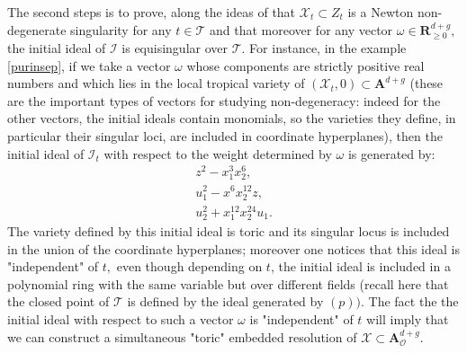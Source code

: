 \documentclass[11pt, a4paper]{amsart}
\numberwithin{equation}{section}
\theoremstyle{plain}
\theoremstyle{definition}
\theoremstyle{remark}
\newcommand{\cI}{\mathcal{I}}
\newcommand{\cO}{\mathcal{O}}
\newcommand{\cT}{\mathcal{T}}
\newcommand{\cX}{\mathcal{X}}
\newcommand{\0}{{\boldsymbol 0}}
\begin{document}
The second steps is to prove, along the ideas of \cite{Tevelev,Aroca1,AGM} that $\cX_t\subset Z_t$ is a Newton 
non-degenerate singularity for any $t \in \cT$ and that moreover for any vector $\omega \in \mathbf{R}_{\geq 0}^{d+g},$ the initial ideal of $\cI$ is equisingular over $\cT.$ For instance, in the example \eqref{purinsep}, if we take a vector $\omega$ whose components are strictly positive real numbers and which lies in the local tropical variety of $(\cX_t,0)\subset \mathbf{A}^{d+g}$ (these are the important types of vectors for studying non-degeneracy: indeed for the other vectors, the initial ideals contain monomials, so the varieties they define, in particular their singular loci, are included in coordinate hyperplanes), then the initial ideal of $\cI_t$  with respect to the weight determined by $\omega$ is generated by:
$$
\begin{array}{ll}
    z^2-x_1^3x_2^6,\\
     u_1^2-x^6x_2^{12}z,\\
u_2^2+x_1^{12}x_2^{24}u_1.
     \end{array} 
$$
The variety defined by this initial ideal is toric and its singular locus is included in the union of the coordinate hyperplanes; moreover one notices that this ideal is "independent" of $t,$ even though depending on $t$, the initial ideal is included in a polynomial ring with the same variable but over different fields (recall here that the closed point of $\cT$ is defined by the ideal generated by $(p)).$ The fact the the initial ideal with respect to such a vector $\omega$ is "independent" of $t$ will imply that we can construct a simultaneous "toric" embedded resolution of $\cX\subset \mathbf{A}_\cO^{d+g}.$







\end{document}
